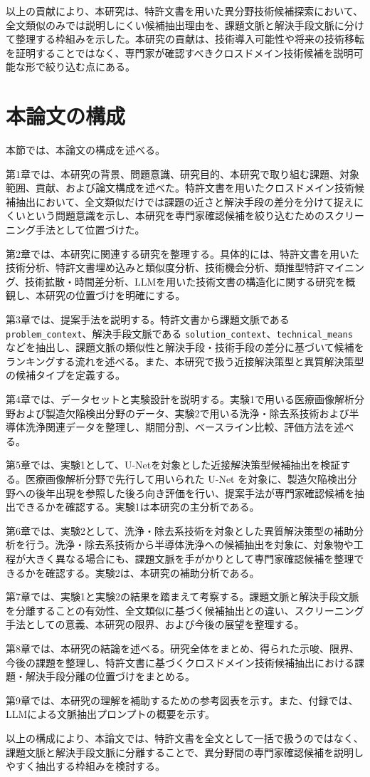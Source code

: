 以上の貢献により、本研究は、特許文書を用いた異分野技術候補探索において、全文類似のみでは説明しにくい候補抽出理由を、課題文脈と解決手段文脈に分けて整理する枠組みを示した。本研究の貢献は、技術導入可能性や将来の技術移転を証明することではなく、専門家が確認すべきクロスドメイン技術候補を説明可能な形で絞り込む点にある。

\section{本論文の構成}

本節では、本論文の構成を述べる。

第1章では、本研究の背景、問題意識、研究目的、本研究で取り組む課題、対象範囲、貢献、および論文構成を述べた。特許文書を用いたクロスドメイン技術候補抽出において、全文類似だけでは課題の近さと解決手段の差分を分けて捉えにくいという問題意識を示し、本研究を専門家確認候補を絞り込むためのスクリーニング手法として位置づけた。

第2章では、本研究に関連する研究を整理する。具体的には、特許文書を用いた技術分析、特許文書埋め込みと類似度分析、技術機会分析、類推型特許マイニング、技術拡散・時間差分析、LLMを用いた技術文書の構造化に関する研究を概観し、本研究の位置づけを明確にする。

第3章では、提案手法を説明する。特許文書から課題文脈である \texttt{problem\_context}、解決手段文脈である \texttt{solution\_context}、\texttt{technical\_means} などを抽出し、課題文脈の類似性と解決手段・技術手段の差分に基づいて候補をランキングする流れを述べる。また、本研究で扱う近接解決策型と異質解決策型の候補タイプを定義する。

第4章では、データセットと実験設計を説明する。実験1で用いる医療画像解析分野および製造欠陥検出分野のデータ、実験2で用いる洗浄・除去系技術および半導体洗浄関連データを整理し、期間分割、ベースライン比較、評価方法を述べる。

第5章では、実験1として、U-Netを対象とした近接解決策型候補抽出を検証する。医療画像解析分野で先行して用いられた U-Net を対象に、製造欠陥検出分野への後年出現を参照した後ろ向き評価を行い、提案手法が専門家確認候補を抽出できるかを確認する。実験1は本研究の主分析である。

第6章では、実験2として、洗浄・除去系技術を対象とした異質解決策型の補助分析を行う。洗浄・除去系技術から半導体洗浄への候補抽出を対象に、対象物や工程が大きく異なる場合にも、課題文脈を手がかりとして専門家確認候補を整理できるかを確認する。実験2は、本研究の補助分析である。

第7章では、実験1と実験2の結果を踏まえて考察する。課題文脈と解決手段文脈を分離することの有効性、全文類似に基づく候補抽出との違い、スクリーニング手法としての意義、本研究の限界、および今後の展望を整理する。

第8章では、本研究の結論を述べる。研究全体をまとめ、得られた示唆、限界、今後の課題を整理し、特許文書に基づくクロスドメイン技術候補抽出における課題・解決手段分離の位置づけをまとめる。

第9章では、本研究の理解を補助するための参考図表を示す。また、付録では、LLMによる文脈抽出プロンプトの概要を示す。

以上の構成により、本論文では、特許文書を全文として一括で扱うのではなく、課題文脈と解決手段文脈に分離することで、異分野間の専門家確認候補を説明しやすく抽出する枠組みを検討する。
